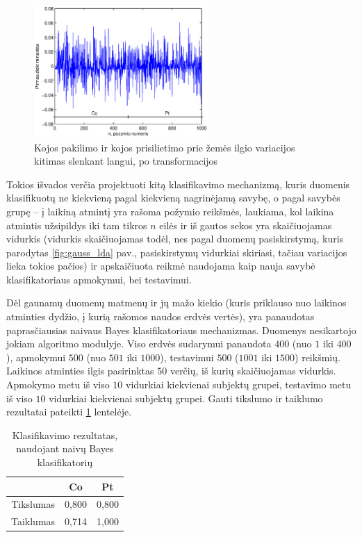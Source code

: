 \documentclass[]{vgtuef}
\begin{document}
\begin{figure}
	\centering
	\includegraphics[width=250px]{figures/11_sample_testing}
	\caption{Kojos pakilimo ir kojos prisilietimo prie žemės ilgio variacijos kitimas slenkant langui, po transformacijos}
	\label{fig:testing_sample}
\end{figure}

Tokios išvados verčia projektuoti kitą klasifikavimo mechanizmą, kuris duomenis klasifikuotų ne kiekvieną pagal kiekvieną nagrinėjamą savybę, o pagal savybės grupę -- į laikiną atmintį yra rašoma požymio reikšmės, laukiama, kol laikina atmintis užsipildys iki tam tikros $n$ eilės ir iš gautos sekos yra skaičiuojamas vidurkis (vidurkis skaičiuojamas todėl, nes pagal duomenų pasiskirstymą, kuris parodytas \ref{fig:gauss_lda} pav., pasiskirstymų vidurkiai skiriasi, tačiau variacijos lieka tokios pačios) ir apskaičiuota reikmė naudojama kaip nauja savybė klasifikatoriaus apmokymui, bei testavimui. 

Dėl gaunamų duomenų matmenų ir jų mažo kiekio (kuris priklauso nuo laikinos atminties dydžio, į kurią rašomos naudos erdvės vertės), yra panaudotas paprasčiausias naivaus Bayes klasifikatoriaus mechanizmas. Duomenys nesikartojo jokiam algoritmo modulyje. Viso erdvės sudarymui panaudota $400$ (nuo $1$ iki $400$), apmokymui $500$ (nuo $501$ iki $1000$), testavimui $500$ ($1001$ iki $1500$) reikšmių. Laikinos atminties ilgis pasirinktas $50$ verčių, iš kurių skaičiuojamas vidurkis. Apmokymo metu iš viso $10$ vidurkiai kiekvienai subjektų grupei, testavimo metu iš viso $10$ vidurkiai kiekvienai subjektų grupei. Gauti tikslumo ir taiklumo rezultatai pateikti \ref{table:classification_results} lentelėje.

\begin{table}
	\centering
	\caption{Klasifikavimo rezultatas, naudojant naivų Bayes klasifikatorių}
	\label{table:classification_results}
	\begin{tabular}{|c|c|c|} \hline
		& Co & Pt \\ \hline
    Tikslumas & 0,800 & 0,800 \\ \hline
    Taiklumas & 0,714 & 1,000 \\ \hline
	\end{tabular}
\end{table}
\end{document}
